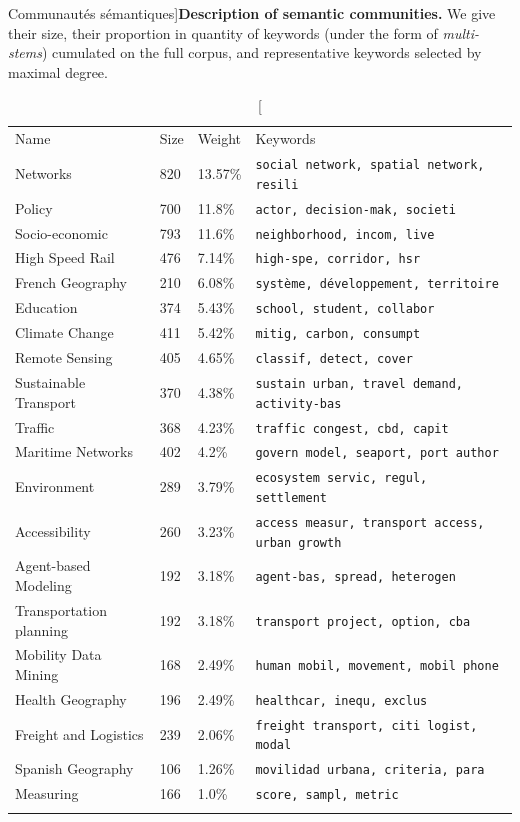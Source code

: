 \documentclass[galley]{jtlu-article-2col}
\begin{document}
\begin{table}
\caption[Semantic communities][Communautés sémantiques]{\textbf{Description of semantic communities.} We give their size, their proportion in quantity of keywords (under the form of \emph{multi-stems}) cumulated on the full corpus, and representative keywords selected by maximal degree.\label{tab:quantepistemo:semanticdomains}}
\begin{tabular}{llll}
\hline\noalign{\smallskip}
Name & Size & Weight & Keywords  \\
\noalign{\smallskip}\hline\noalign{\smallskip}
Networks & 820 & 13.57\% & \texttt{social network, spatial network, resili} \\
Policy & 700 & 11.8\% & \texttt{actor, decision-mak, societi} \\
Socio-economic & 793 & 11.6\% & \texttt{neighborhood, incom, live} \\
High Speed Rail & 476 & 7.14\% & \texttt{high-spe, corridor, hsr} \\
French Geography & 210 & 6.08\% & \texttt{système, développement, territoire} \\
Education & 374 & 5.43\% & \texttt{school, student, collabor} \\
Climate Change & 411 & 5.42\% & \texttt{mitig, carbon, consumpt} \\
Remote Sensing & 405 & 4.65\% & \texttt{classif, detect, cover} \\
Sustainable Transport & 370 & 4.38\% & \texttt{sustain urban, travel demand, activity-bas} \\
Traffic & 368 & 4.23\% & \texttt{traffic congest, cbd, capit} \\
Maritime Networks & 402 & 4.2\% & \texttt{govern model, seaport, port author} \\
Environment & 289 & 3.79\% & \texttt{ecosystem servic, regul, settlement} \\
Accessibility & 260 & 3.23\% & \texttt{access measur, transport access, urban growth} \\
Agent-based Modeling & 192 & 3.18\% & \texttt{agent-bas, spread, heterogen} \\
Transportation planning & 192 & 3.18\% & \texttt{transport project, option, cba} \\
Mobility Data Mining & 168 & 2.49\% & \texttt{human mobil, movement, mobil phone} \\
Health Geography & 196 & 2.49\% & \texttt{healthcar, inequ, exclus} \\
Freight and Logistics & 239 & 2.06\% & \texttt{freight transport, citi logist, modal} \\
Spanish Geography & 106 & 1.26\% & \texttt{movilidad urbana, criteria, para} \\
Measuring & 166 & 1.0\% & \texttt{score, sampl, metric} \\
\noalign{\smallskip}\hline
\end{tabular}
\end{table}
\end{document}
